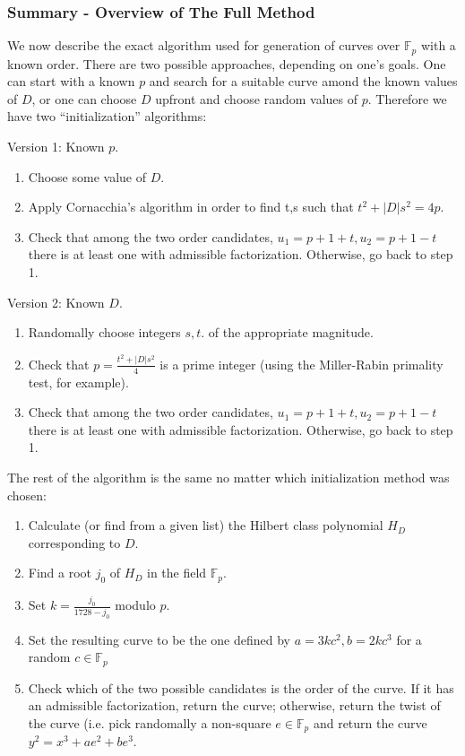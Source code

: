 \documentclass[11pt,english]{article}
\begin{document}
\subsubsection{Summary - Overview of The Full Method}
We now describe the exact algorithm used for generation of curves over $\mathbb{F}_p$ with a known order. There are two possible approaches, depending on one's goals.
One can start with a known $p$ and search for a suitable curve amond the known values of $D$, or one can choose $D$ upfront and choose random values of $p$. Therefore we have
two ``initialization'' algorithms:

Version 1: Known $p$.
\begin{enumerate}
 \item Choose some value of $D$.
 \item Apply Cornacchia's algorithm in order to find t,s such that $t^2+|D|s^2=4p$.
 \item Check that among the two order candidates, $u_1=p+1+t,u_2=p+1-t$ there is at least one with admissible factorization. Otherwise, go back to step 1.
\end{enumerate}

Version 2: Known $D$.
\begin{enumerate}
 \item Randomally choose integers $s,t$. of the appropriate magnitude.
 \item Check that $p=\frac{t^2+|D|s^2}{4}$ is a prime integer (using the Miller-Rabin primality test, for example).
 \item Check that among the two order candidates, $u_1=p+1+t,u_2=p+1-t$ there is at least one with admissible factorization. Otherwise, go back to step 1.
\end{enumerate}

The rest of the algorithm is the same no matter which initialization method was chosen:

\begin{enumerate}
 \item Calculate (or find from a given list) the Hilbert class polynomial $H_D$ corresponding to $D$.
 \item Find a root $j_0$ of $H_D$ in the field $\mathbb{F}_p$.
 \item Set $k=\frac{j_0}{1728-j_0}$ modulo $p$.
 \item Set the resulting curve to be the one defined by $a=3kc^2,b=2kc^3$ for a random $c\in\mathbb{F}_p$
 \item Check which of the two possible candidates is the order of the curve. If it has an admissible factorization, return the curve; otherwise,
	  return the twist of the curve (i.e. pick randomally a non-square $e\in\mathbb{F}_p$ and return the curve $y^2=x^3+ae^2+be^3$.
\end{enumerate}
\end{document}
